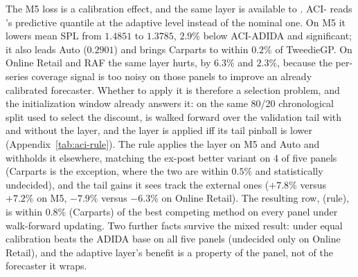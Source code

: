 The M5 loss is a calibration effect, and the same layer is available to
\EBB{}. ACI-\EBB{} reads \EBB{}'s predictive quantile at the adaptive
level instead of the nominal one. On M5 it lowers mean SPL from $1.4851$
to $1.3785$, $2.9\%$ below ACI-ADIDA and significant; it also leads Auto
($0.2901$) and brings Carparts to within $0.2\%$ of TweedieGP. On Online
Retail and RAF the same layer hurts, by $6.3\%$ and $2.3\%$, because the
per-series coverage signal is too noisy on those panels to improve an
already calibrated forecaster. Whether to apply it is therefore a
selection problem, and the initialization window already answers it: on
the same 80/20 chronological split used to select the discount, \EBB{} is
walked forward over the validation tail with and without the layer, and
the layer is applied iff its tail pinball is lower
(Appendix~\ref{tab:aci-rule}). The rule applies the layer on M5 and Auto
and withholds it elsewhere, matching the ex-post better variant on
4 of five panels (Carparts is the exception, where the two
are within $0.5\%$ and statistically undecided), and the tail gains it
sees track the external ones ($+7.8\%$ versus $+7.2\%$ on M5, $-7.9\%$
versus $-6.3\%$ on Online Retail). The resulting row, \EBB{} (rule), is
within 0.8\% ({Carparts}) of the best competing method on every
panel under walk-forward updating. Two further facts survive the mixed
result: under equal calibration \EBB{} beats the ADIDA base on all five
panels (undecided only on Online Retail), and the adaptive layer's benefit
is a property of the panel, not of the forecaster it wraps.

